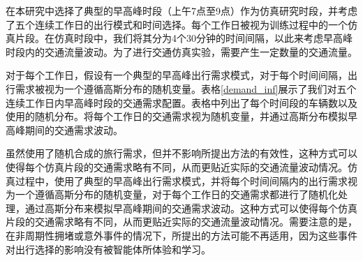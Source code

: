 在本研究中选择了典型的早高峰时段（上午7点至9点）作为仿真研究时段，并考虑了五个连续工作日的出行模式和时间选择。每个工作日被视为训练过程中的一个仿真片段。在仿真时段中，我们将其分为4个30分钟的时间间隔，以此来考虑早高峰时段内的交通流量波动。为了进行交通仿真实验，需要产生一定数量的交通流量。

对于每个工作日，假设有一个典型的早高峰出行需求模式，对于每个时间间隔，出行需求被视为一个遵循高斯分布的随机变量。表格\ref{demand_inf}展示了我们对五个连续工作日内早高峰时段的交通需求配置。表格中列出了每个时间段的车辆数以及使用的随机分布。将每个工作日的交通需求视为随机变量，并通过高斯分布模拟早高峰期间的交通需求波动。
\renewcommand{\arraystretch}{1.2} %
\begin{table}[htbp]
\centering
\caption{连续五个工作日早高峰期的出行需求配置}
\label{demand_inf}
\begin{adjustbox}{center}
\end{adjustbox}
\end{table}


虽然使用了随机合成的旅行需求，但并不影响所提出方法的有效性，这种方式可以使得每个仿真片段的交通需求略有不同，从而更贴近实际的交通流量波动情况。仿真过程中，使用了典型的早高峰出行需求模式，并将每个时间间隔内的出行需求视为一个遵循高斯分布的随机变量，对于每个工作日的交通需求都进行了随机化处理，通过高斯分布来模拟早高峰期间的交通需求波动。这种方式可以使得每个仿真片段的交通需求略有不同，从而更贴近实际的交通流量波动情况。需要注意的是，在非周期性拥堵或意外事件的情况下，所提出的方法可能不再适用，因为这些事件对出行选择的影响没有被智能体所体验和学习。

